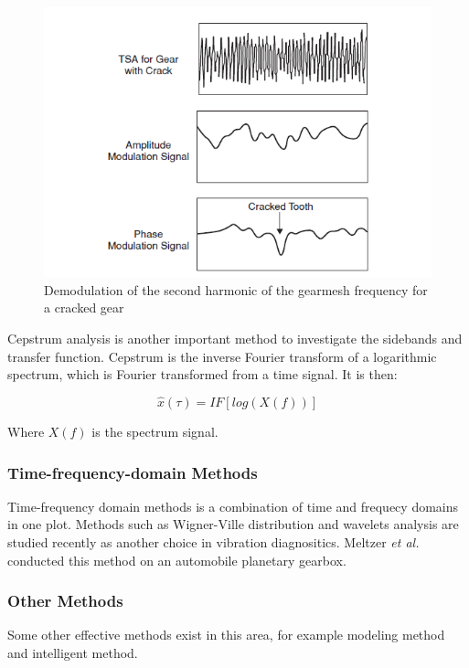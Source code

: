 \begin{figure}
	\centering
	\includegraphics{demodulation}
	\caption{Demodulation of the second harmonic of the gearmesh frequency for a cracked gear \cite{mc4}}
	\label{demodulation}
\end{figure}

Cepstrum analysis is another important method to investigate the sidebands and transfer function. Cepstrum is the inverse Fourier transform of a logarithmic spectrum, which is Fourier transformed from a time signal. It is then:

\begin{equation}
\hat{x}(\tau) = IF[log(X(f))]
\end{equation}

Where $X(f)$ is the spectrum signal.

\subsubsection{Time-frequency-domain Methods}

Time-frequency domain methods is a combination of time and frequecy domains in one plot. Methods such as Wigner-Ville distribution and wavelets analysis are studied recently as another choice in vibration diagnositics. Meltzer \textit{et al.} \cite{mel1} \cite{mel2} conducted this method on an automobile planetary gearbox.

\subsubsection{Other Methods}

Some other effective methods exist in this area, for example modeling method and intelligent method.

